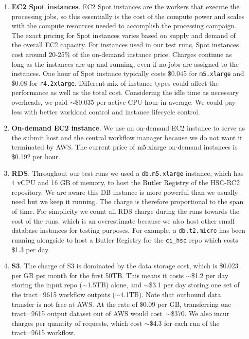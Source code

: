 \begin{enumerate}
\item \textbf{EC2 Spot instances}.
EC2 Spot instances are the workers that execute the processing jobs, so this essentially is the cost of the compute power and scales with the compute resources needed to accomplish the processing campaign.
The exact pricing for Spot instances varies based on supply and demand of the overall EC2 capacity.
For instances used in our test runs, Spot instances cost around 20-25\% of the on-demand instance price.
Charges continue as long as the instances are up and running, even if no jobs are assigned to the instances.
One hour of Spot instance typically costs \$0.045 for \texttt{m5.xlarge} and \$0.08 for \texttt{r4.2xlarge}.
Different mix of instance types could affect the performance as well as the total cost.
Considering the idle time as necessary overheads, we paid $\sim$\$0.035 per active CPU hour in average.
We could pay less with better workload control and instance lifecycle control.

\item \textbf{On-demand EC2 instance}.
We use an on-demand EC2 instance to serve as the submit host and the central workflow manager because we do not want it terminated by AWS.
The current price of m5.xlarge on-demand instances is \$0.192 per hour.

\item \textbf{RDS}.
Throughout our test runs we used a \texttt{db.m5.xlarge} instance, which has 4 vCPU and 16 GB of memory, to host the Butler Registry of the HSC-RC2 repository.
We are aware this DB instance is more powerful than we usually need but we keep it running.
The charge is therefore proportional to the span of time.
For simplicity we count all RDS charge during the runs towards the cost of the runs, which is an overestimate because we also host other small database instances for testing purposes.
For example, a \texttt{db.t2.micro} has been running alongside to host a Butler Registry for the \texttt{ci\_hsc} repo which costs \$1.3 per day.

\item \textbf{S3}.
The charge of S3 is dominated by the data storage cost, which is \$0.023 per GB per month for the first 50TB.
This means it costs $\sim$\$1.2 per day storing the input repo ($\sim$1.5TB) alone, and $\sim$\$3.1 per day storing one set of the tract=9615 workflow outputs ($\sim$4.1TB).
Note that outbound data transfer is not free at AWS.
At the rate of \$0.09 per GB, transferring one tract=9615 output dataset out of AWS would cost~$\sim$\$370.
We also incur charges per quantity of requests, which cost $\sim$\$4.3 for each run of the tract=9615 workflow.


\end{enumerate}
